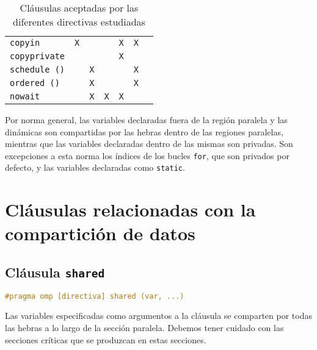 \begin{table}[!h]
\begin{center}
\begin{tabular}{l c c c c c c}
	\texttt{copyin}          & \texttt{X}        &              &                   & \texttt{X}      & \texttt{X}            &                            \\
	\texttt{copyprivate}     &                   &              &                   & \texttt{X}      &                       &                            \\
	\texttt{schedule ()}     &                   & \texttt{X}   &                   &                 & \texttt{X}            &                            \\
	\texttt{ordered ()}      &                   & \texttt{X}   &                   &                 & \texttt{X}            &                            \\
	\texttt{nowait}          &                   & \texttt{X}   & \texttt{X}        & \texttt{X}      &                       &                            \\
\end{tabular}
\end{center}
\caption{Cláusulas aceptadas por las diferentes directivas estudiadas}\label{clausulas-omp-definiciones-aceptacion}
\end{table}

Por norma general, las variables declaradas fuera de la región paralela y las dinámicas son compartidas por las hebras dentro de las regiones paralelas, mientras que las variables declaradas dentro de las mismas son privadas.
Son excepciones a esta norma los índices de los bucles \texttt{for}, que son privados por defecto, y las variables declaradas como \texttt{static}.

\section{Cláusulas relacionadas con la compartición de datos}\label{clausulas-openmp-comparticion-de-datos}

\subsection{Cláusula \texttt{shared}}

\begin{lstlisting}[language=C]
#pragma omp [directiva] shared (var, ...)
\end{lstlisting}

Las variables especificadas como argumentos a la cláusula se comparten por todas las hebras a lo largo de la sección paralela.
Debemos tener cuidado con las secciones críticas que se produzcan en estas secciones.

